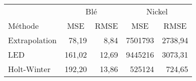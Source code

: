 \begin{tabular}{lrrrr}
\toprule
& \multicolumn{2}{c}{Blé} & \multicolumn{2}{c}{Nickel} \\
Méthode & \multicolumn{1}{c}{MSE} & \multicolumn{1}{c}{RMSE} & \multicolumn{1}{c}{MSE} & \multicolumn{1}{c}{RMSE} \\
\cmidrule(r){1-1}\cmidrule(lr){2-3}\cmidrule(lr){4-5}
Extrapolation & 78,19 & 8,84 & 7501793 & 2738,94 \\
LED   & 161,02 & 12,69 & 9445216 & 3073,31 \\
Holt-Winter & 192,20 & 13,86 & 525124 & 724,65 \\
\bottomrule
\end{tabular}
